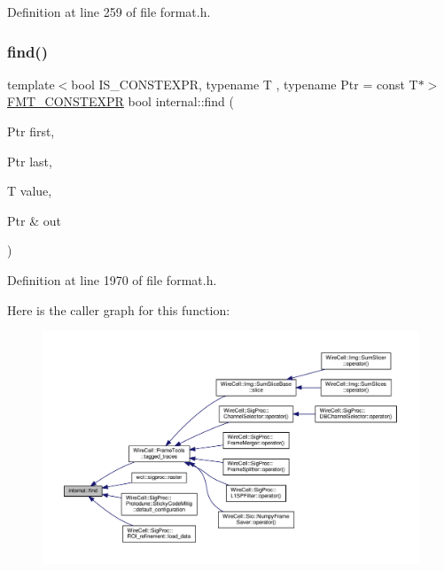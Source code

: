 Definition at line 259 of file format.\+h.

\mbox{\label{namespaceinternal_a1fb268779155d9e5cb2ee01298cf5541}} 
\subsubsection{\texorpdfstring{find()}{find()}}
{\footnotesize\ttfamily template$<$bool I\+S\+\_\+\+C\+O\+N\+S\+T\+E\+X\+PR, typename T , typename Ptr  = const T$\ast$$>$ \\
\hyperlink{core_8h_a69201cb276383873487bf68b4ef8b4cd}{F\+M\+T\+\_\+\+C\+O\+N\+S\+T\+E\+X\+PR} bool internal\+::find (\begin{DoxyParamCaption}\item[{Ptr}]{first,  }\item[{Ptr}]{last,  }\item[{T}]{value,  }\item[{Ptr \&}]{out }\end{DoxyParamCaption})}



Definition at line 1970 of file format.\+h.

Here is the caller graph for this function\+:
\nopagebreak
\begin{figure}[H]
\begin{center}
\leavevmode
\includegraphics[width=350pt]{namespaceinternal_a1fb268779155d9e5cb2ee01298cf5541_icgraph}
\end{center}
\end{figure}
\mbox{\label{namespaceinternal_a3bd0e0a06013bfea262462a5b187ce27}} 
